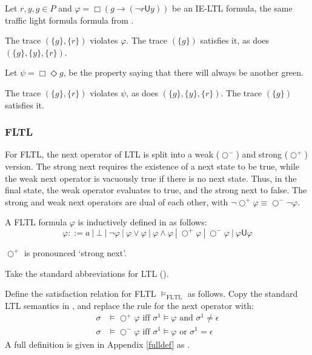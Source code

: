 \documentclass[a4paper]{article}
\newcommand{\U}{\mathsf{U}}
\newcommand{\tand}{\text{ and }}
\newcommand{\tor}{\text{ or }}
\newcommand{\tiff}{\text{ iff }}
\newcommand{\sn}{\bigcirc^+}
\newcommand{\wn}{\bigcirc^-}
\begin{document}
\begin{eg}\label{ieltleg}
  Let $r,y,g\in P$ and $\varphi = \Box (g \to (\neg r \U y))$ be an IE-LTL formula, the same traffic light formula formula from .

  The trace $(\{g\},\{r\})$ violates $\varphi$. The trace $(\{g\})$ satisfies it, as does $(\{g\},\{y\},\{r\})$.

  Let $\psi = \Box \Diamond g $, be the property saying that there will always be another green.

  The trace $(\{g\},\{r\})$ violates $\psi$, as does $(\{g\},\{y\},\{r\})$. The trace $(\{g\})$ satisfies it.

\end{eg}


\subsubsection{FLTL} For FLTL, the next operator of LTL is split into a weak ($\wn$) and strong ($\sn$) version.
The strong next requires the existence of a next state to be true, while the weak next operator is vacuously true if there is no next state.
Thus, in the final state, the weak operator evaluates to true, and the strong next to false. The strong and weak next operators are dual of each other, with  $\neg\sn\varphi \equiv \wn\neg\varphi$.

\begin{defn}

  A FLTL formula $\varphi$ is inductively defined in as follows:
  \[\varphi ::= a ~|~ \bot ~|~ \neg \varphi ~|~\varphi \lor \varphi ~|~ \varphi \land \varphi ~|~ \sn \varphi ~|~ \wn \varphi ~|~ \varphi \U\varphi\]

  $\sn$ is pronounced `strong next'.
\end{defn}

\begin{notn}\label{fltlabbrev}

  Take the standard abbreviations for LTL ().%
\end{notn}

\begin{defn}\label{fltlsem}

  Define the satisfaction relation for FLTL $\vDash_{\text{FLTL}}$ as follows.
  Copy the standard LTL semantics in , and replace the rule for the next operator with:
  \begin{align*}
    \sigma&\vDash\sn\varphi \tiff \sigma^1\vDash\varphi \tand \sigma^1 \neq \epsilon\\
    \sigma&\vDash\wn\varphi \tiff \sigma^1\vDash\varphi \tor \sigma^1 = \epsilon
  \end{align*}
  A full definition is given in Appendix \ref{fulldef} as .
\end{defn}
\end{document}
